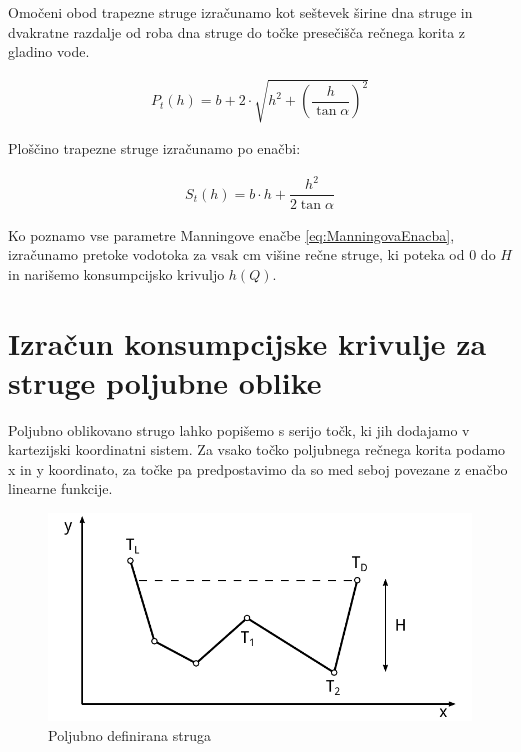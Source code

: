 \begin{enumerate}
	Omočeni obod trapezne struge izračunamo kot seštevek širine dna struge in dvakratne razdalje od roba dna struge do točke presečišča rečnega korita z gladino vode.
	
	\begin{ceqn}
	\begin{align}
	P_{t}(h) = b + 2 \cdot \sqrt{h^2 + \left(\dfrac{h} {\tan\alpha} \right)^{2}}
	\end{align}
	\end{ceqn}
	
	Ploščino trapezne struge izračunamo po enačbi:
	\begin{ceqn}
	\begin{align}
	S_{t}(h) = b \cdot h + \dfrac{h^2}{ 2\tan\alpha}
	\end{align}
	\end{ceqn}
	
\end{enumerate}



Ko poznamo vse parametre Manningove enačbe \ref{eq:ManningovaEnacba}, izračunamo pretoke vodotoka za vsak cm višine rečne struge, ki poteka od 0 do $H$ in narišemo konsumpcijsko krivuljo $h(Q)$.


\newpage
\section{Izračun konsumpcijske krivulje za struge poljubne oblike}\label{sec:pretokNumericnaMetoda}


Poljubno oblikovano strugo lahko popišemo s serijo točk, ki jih dodajamo v kartezijski koordinatni sistem. Za vsako točko poljubnega rečnega korita podamo x in y koordinato, za točke pa predpostavimo da so med seboj povezane z enačbo linearne funkcije. 

\begin{figure}[ht!]
	\begin{centering}
		\includegraphics{slike/customChannel/customStruga.pdf}		
		\caption{Poljubno definirana struga}\label{fig:poljubnaStruga}
	\end{centering}
\end{figure}



